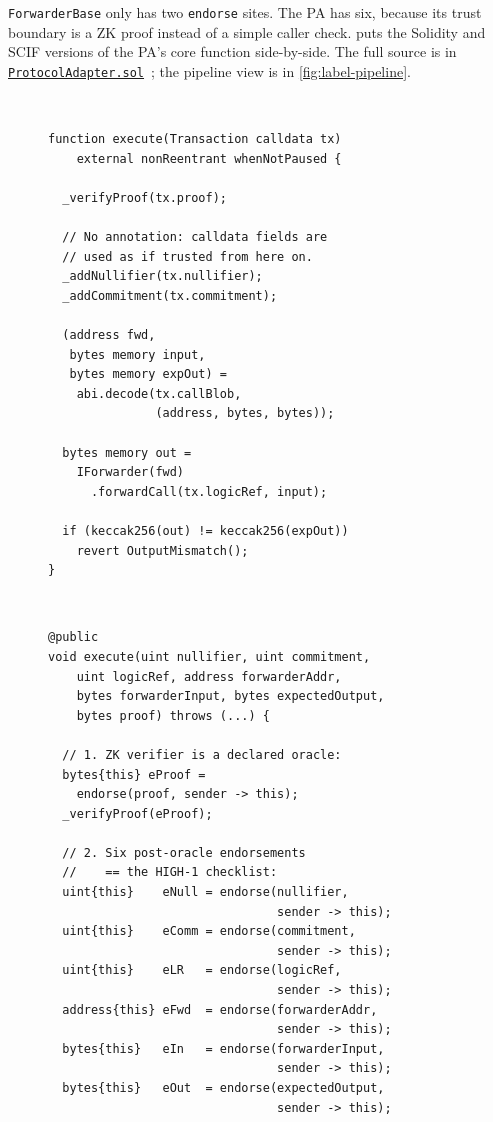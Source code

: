 \documentclass[11pt,a4paper]{article}
\begin{document}
\texttt{ForwarderBase} only has two \texttt{endorse} sites. The PA has six,
because its trust boundary is a ZK proof instead of a simple caller check.
 puts the Solidity and SCIF versions of the PA's
core function side-by-side. The full source is in
\href{https://github.com/anoma/pa-evm/blob/main/contracts/src/ProtocolAdapter.sol}{\texttt{ProtocolAdapter.sol}}~\cite{paevmrepo};
the pipeline view is in \cref{fig:label-pipeline}.

\begin{figure}[h]
\noindent
\begin{minipage}[t]{0.48\textwidth}
\\[2pt]
\begin{lstlisting}[style=soliditystyleCompact]
function execute(Transaction calldata tx)
    external nonReentrant whenNotPaused {

  _verifyProof(tx.proof);

  // No annotation: calldata fields are
  // used as if trusted from here on.
  _addNullifier(tx.nullifier);
  _addCommitment(tx.commitment);

  (address fwd,
   bytes memory input,
   bytes memory expOut) =
    abi.decode(tx.callBlob,
               (address, bytes, bytes));

  bytes memory out =
    IForwarder(fwd)
      .forwardCall(tx.logicRef, input);

  if (keccak256(out) != keccak256(expOut))
    revert OutputMismatch();
}
\end{lstlisting}
\end{minipage}%
\hfill
\begin{minipage}[t]{0.50\textwidth}
\\[2pt]
\begin{lstlisting}[style=scifstyleCompact]
@public
void execute(uint nullifier, uint commitment,
    uint logicRef, address forwarderAddr,
    bytes forwarderInput, bytes expectedOutput,
    bytes proof) throws (...) {

  // 1. ZK verifier is a declared oracle:
  bytes{this} eProof =
    endorse(proof, sender -> this);
  _verifyProof(eProof);

  // 2. Six post-oracle endorsements
  //    == the HIGH-1 checklist:
  uint{this}    eNull = endorse(nullifier,
                                sender -> this);
  uint{this}    eComm = endorse(commitment,
                                sender -> this);
  uint{this}    eLR   = endorse(logicRef,
                                sender -> this);
  address{this} eFwd  = endorse(forwarderAddr,
                                sender -> this);
  bytes{this}   eIn   = endorse(forwarderInput,
                                sender -> this);
  bytes{this}   eOut  = endorse(expectedOutput,
                                sender -> this);


\end{lstlisting}
\end{minipage}
\end{figure}
\end{document}
